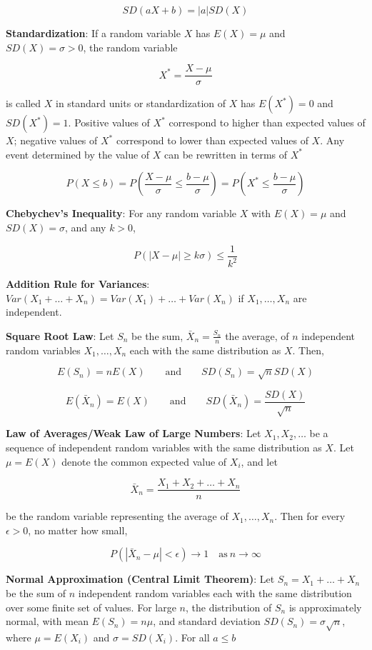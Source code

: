 \documentclass{article}
\begin{document}
\[SD(aX+b)=|a|SD(X)\]

\noindent\textbf{\color{blue}Standardization}: If a random variable $X$ has $E(X)=\mu$ and $SD(X)=\sigma>0$, the random variable

\[X^*=\frac{X-\mu}{\sigma}\]
 
is called $X$ in standard units or standardization of $X$ has $E(X^*)=0$ and $SD(X^*)=1$. Positive values of $X^*$ correspond to higher than expected values of $X$; negative values of $X^*$ correspond to lower than expected values of $X$. Any event determined by the value of $X$ can be rewritten in terms of $X^*$
 
\[P(X\le b)=P(\frac{X-\mu}{\sigma}\le\frac{b-\mu}{\sigma})=P(X^*\le\frac{b-\mu}{\sigma})\]
 
\noindent\textbf{\color{red}Chebychev's Inequality}: For any random variable $X$ with $E(X)=\mu$ and $SD(X)=\sigma$, and any $k>0$,

\[P(|X-\mu|\ge k\sigma)\le\frac{1}{k^2}\]

\noindent\textbf{\color{red}Addition Rule for Variances}:$Var(X_1+\ldots+X_n)=Var(X_1)+\ldots+Var(X_n)$ if $X_1,\ldots,X_n$ are independent.

\noindent\textbf{\color{red}Square Root Law}: Let $S_n$ be the sum, $\bar{X}_n=\frac{S_n}{n}$ the average, of $n$ independent random variables $X_1,\ldots,X_n$ each with the same distribution as $X$. Then,

\[E(S_n)=nE(X)\qquad\text{and}\qquad SD(S_n)=\sqrt{n}SD(X)\]

\[E(\bar{X}_n)=E(X)\qquad\text{and}\qquad SD(\bar{X}_n)=\frac{SD(X)}{\sqrt{n}}\]
 
\noindent\textbf{\color{red}Law of Averages/Weak Law of Large Numbers}: Let $X_1,X_2,\ldots$ be a sequence of independent random variables with the same distribution as $X$. Let $\mu=E(X)$ denote the common expected value of $X_i$, and let

\[\bar{X}_n=\frac{X_1+X_2+\ldots+X_n}{n}\]

be the random variable representing the average of $X_1,\ldots,X_n$. Then for every $\epsilon>0$, no matter how small,

\[P(|\bar{X}_n-\mu|<\epsilon)\rightarrow1\quad\text{as}\ n\rightarrow\infty\]

\noindent\textbf{\color{red}Normal Approximation (Central Limit Theorem)}: Let $S_n=X_1+\ldots+X_n$ be the sum of $n$ independent random variables each with the same distribution over some finite set of values. For large $n$, the distribution of $S_n$ is approximately normal, with mean $E(S_n)=n\mu$, and standard deviation $SD(S_n)=\sigma\sqrt{n}$, where $\mu=E(X_i)$ and $\sigma=SD(X_i)$. For all $a\le b$
\end{document}
